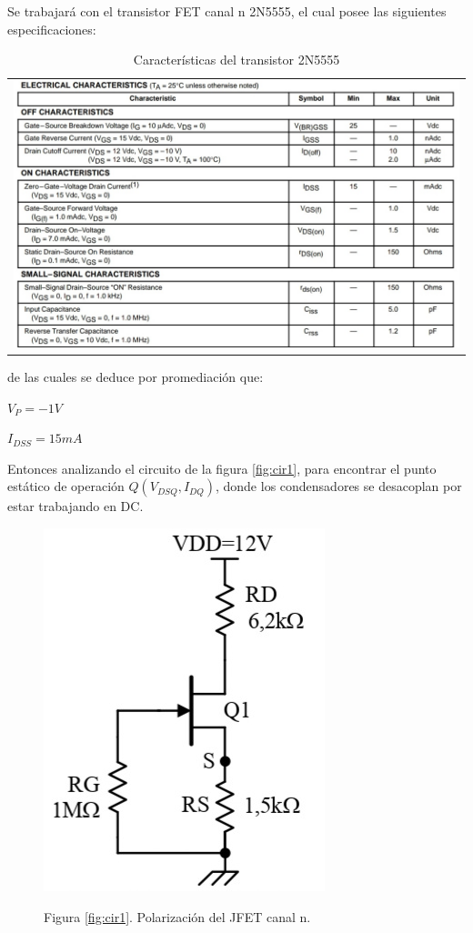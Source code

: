\documentclass[12pt, a4paper]{article}
\begin{document}
    Se trabajará con el transistor FET canal n 2N5555, el cual posee las siguientes especificaciones:
    
    \begin{table}[h!]
        \centering
        \caption{Características del transistor 2N5555} %
        \label{tab:5555} %
        \begin{tabular}{c}
            \includegraphics[width=16cm\textwidth]{2N5555.jpg} \\
        \end{tabular}
    \end{table}
    
    de las cuales se deduce por promediación que:

    $V_P = -1V$

    $I_{DSS} = 15mA$

    Entonces analizando el circuito de la figura \ref{fig:cir1}, para encontrar el punto estático de operación $Q(V_{DSQ},I_{DQ})$, donde los condensadores se desacoplan por estar trabajando en DC.

    \begin{figure}[h!]
        \centering
        \includegraphics[height=5cm\textwidth]{circuito1.jpg} \par
        Figura \ref{fig:cir1}. Polarización del JFET canal n.
    \end{figure}
\end{document}
